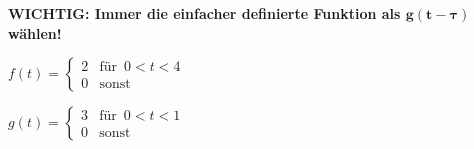 \begin{minipage}{0.45\columnwidth}
    
\end{minipage}
\hfill
\begin{minipage}{0.45\columnwidth}
    
\end{minipage}



\textbf{WICHTIG: Immer die einfacher definierte Funktion als $\bm{g(t - \tau)}$ wählen!}

\begin{minipage}[t]{0.45\columnwidth}
    $f(t) = \begin{cases}
    2 & \text{für } \, 0 < t < 4 \\
    0 & \text{sonst}
    \end{cases}$  
\end{minipage}
\hfill
\begin{minipage}[t]{0.5\columnwidth}
    $g(t) = \begin{cases}			
    3 & \text{für } \, 0 < t < 1 \\
    0 & \text{sonst}
    \end{cases}$  	
\end{minipage}

\vspace{0.2cm}

